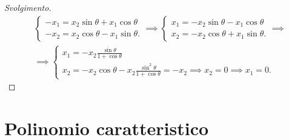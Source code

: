 \begin{proof}[Svolgimento]
\begin{align}
        &\begin{cases}
            -x_1 = x_2 \sin{\theta} + x_1 \cos{\theta} \\
            -x_2 = x_2 \cos{\theta} - x_1 \sin{\theta}.
        \end{cases} \implies \begin{cases}
            x_1 = -x_2 \sin{\theta} - x_1 \cos{\theta} \\
            x_2 = - x_2 \cos{\theta} + x_1 \sin{\theta}.
        \end{cases} \implies \\
        &\implies \begin{cases}
            x_1 = -x_2 \frac{\sin{\theta}}{1+\cos{\theta}} \\
            x_2 = - x_2 \cos{\theta} - x_2\frac{\sin^2{\theta}}{1+\cos{\theta}} = - x_2 \implies x_2 = 0 \implies x_1 = 0.
        \end{cases}
    \end{align}
\end{proof}

\section{Polinomio caratteristico}

